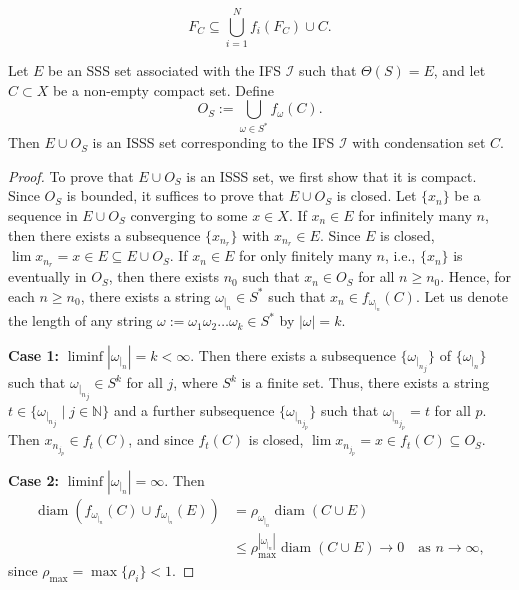\documentclass[10pt,a4paper]{amsart}
\begin{document}
\begin{equation}\label{eq4}
F_C \subseteq \bigcup_{i=1}^N f_i(F_C) \cup C.
\end{equation}

\begin{theorem}
Let $E$ be an SSS set associated with the IFS $\mathcal{I}$ such that $\Theta(S) = E$, and let $C \subset X$ be a non-empty compact set. Define
\[
O_S := \bigcup_{{\omega} \in S^*} f_{{\omega}}(C).
\]
Then $ E\cup O_S$ is an ISSS set corresponding to the IFS $\mathcal{I}$ with condensation set $C$.
\end{theorem}

\begin{proof}
To prove that $E\cup O_S$ is an ISSS set, we first show that it is compact. Since $O_S$ is bounded, it suffices to prove that $E \cup O_S$ is closed. Let $\{x_n\}$ be a sequence in $E \cup O_S$ converging to some $x \in X$. If $x_n \in E$ for infinitely many $n$, then there exists a subsequence $\{x_{n_r}\}$ with $x_{n_r} \in E$. Since $E$ is closed, $\lim x_{n_r} = x \in E \subseteq E \cup O_S$. If $x_n \in E$ for only finitely many $n$, i.e., $\{x_n\}$ is eventually in $O_S$, then there exists $n_0$ such that $x_n \in O_S$ for all $n \geq n_0$. Hence, for each $n \geq n_0$, there exists a string $\omega_{|_n} \in S^*$ such that $x_n \in f_{\omega_{|_n}}(C)$.
Let us denote the length of any string $\omega := \omega_1 \omega_2 \dots \omega_k \in S^*$ by $|\omega|=k.$

\textbf{Case 1:} $\liminf |\omega_{|_n}| = k < \infty$. Then there exists a subsequence $\{\omega_{{|_n}_j}\}$ of $\{\omega_{|_n}\}$ such that $\omega_{{|_n}_j} \in S^k$ for all $j$, where $S^k$ is a finite set. Thus, there exists a string $t \in \{\omega_{{|_n}_j} \mid j \in \mathbb{N}\}$ and a further subsequence $\{\omega_{{|_n}_{j_p}}\}$ such that $\omega_{{|_n}_{j_p}} = t$ for all $p$. Then $x_{n_{j_p}} \in f_t(C)$, and since $f_t(C)$ is closed, $\lim x_{n_{j_p}} = x \in f_t(C) \subseteq O_S$.

\textbf{Case 2:} $\liminf |\omega_{|_n}| = \infty$. Then
\[
\begin{aligned}
\operatorname{diam}(f_{\omega_{|_n}}(C) \cup f_{\omega_{|_n}}(E)) &= \rho_{\omega_{|_n}} \operatorname{diam}(C \cup E) \\
&\leq \rho_{\max}^{|\omega_{|_n}|} \operatorname{diam}(C \cup E) \to 0 \quad \text{as } n \to \infty,
\end{aligned}
\]
since $\rho_{\max} = \max\{\rho_i\} < 1$.


\end{proof}
\end{document}
